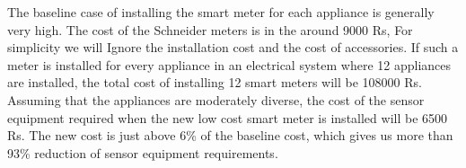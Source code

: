 The baseline case of installing the smart meter for each appliance is generally very high. The cost of the Schneider meters is in the around 9000 Rs, For simplicity we will Ignore the installation cost and the cost of accessories.  If such  a meter is installed for every appliance in an electrical system where 12 appliances are installed, the total cost of installing 12 smart meters will be 108000 Rs. Assuming that the appliances are moderately diverse, the cost of the sensor equipment required when the new low cost smart meter is installed will be 6500 Rs. The new cost is just above  6\% of the baseline cost, which gives us more than 93\% reduction of sensor equipment requirements.
